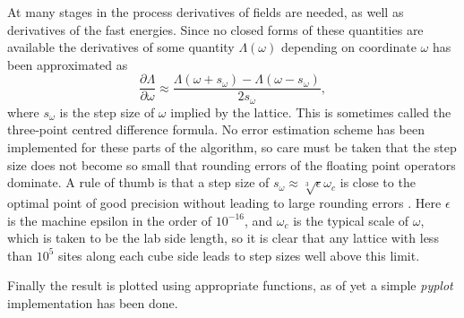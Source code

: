 \documentclass[main.tex]{subfiles}
\begin{document}
At many stages in the process derivatives of fields are needed, as well as derivatives of
the fast energies. Since no closed forms of these quantities are available the derivatives
of some quantity \(\Lambda (\omega)\) depending on coordinate \(\omega\) has been
approximated as \[
\frac{\partial \Lambda}{\partial \omega} \approx \frac{\Lambda(\omega + s_\omega) -
\Lambda(\omega - s_\omega)}{2s_\omega}
,\] 
where \(s_\omega\) is the step size of \(\omega\) implied by the lattice.
This is sometimes called the three-point centred difference formula. No error estimation scheme
has been implemented for these parts of the algorithm, so care must be taken that the step size does not
become so small that rounding errors of the floating point operators dominate.
A rule of thumb is that a step size of \(s_\omega \approx \sqrt[3]{\epsilon}\omega_c\) is
close to the optimal point of good precision without leading to large rounding
errors \cite{numerical}. Here \(\epsilon\) is the machine
epsilon in the order of \(10^{-16}\), and \(\omega_c\) is the typical scale of \(\omega\), which
is taken to be the lab side length, so it is clear that any lattice with less than \(10^5\) sites
along each cube side leads to step sizes well above this limit.

Finally the result is plotted using appropriate functions, as of yet a simple
\textit{pyplot} implementation has been done.
\end{document}
